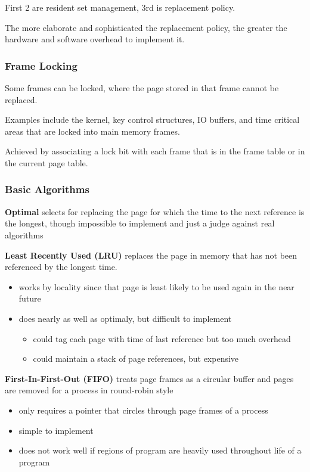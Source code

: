 \documentclass[11pt]{article}
\begin{document}
First 2 are resident set management, 3rd is replacement policy.

The more elaborate and sophisticated the replacement policy, the greater the
hardware and software overhead to implement it.
\subsubsection{Frame Locking}
\label{sec:org0d18fc1}
Some frames can be locked, where the page stored in that frame cannot be replaced.

Examples include the kernel, key control structures, IO buffers, and time critical
areas that are locked into main memory frames.

Achieved by associating a lock bit with each frame that is in the frame table
or in the current page table.
\subsubsection{Basic Algorithms}
\label{sec:orga6e528c}
\textbf{Optimal} selects for replacing the page for which the time to the next
reference is the longest, though impossible to implement and just a judge
against real algorithms

\textbf{Least Recently Used (LRU)} replaces the page in memory that has not been
referenced by the longest time.
\begin{itemize}
\item works by locality since that page is least likely to be used again in the near
future
\item does nearly as well as optimaly, but difficult to implement
\begin{itemize}
\item could tag each page with time of last reference but too much overhead
\item could maintain a stack of page references, but expensive
\end{itemize}
\end{itemize}

\textbf{First-In-First-Out (FIFO)} treats page frames as a circular buffer and pages
are removed for a process in round-robin style
\begin{itemize}
\item only requires a pointer that circles through page frames of a process
\item simple to implement
\item does not work well if regions of program are heavily used throughout life
of a program
\end{itemize}
\end{document}
